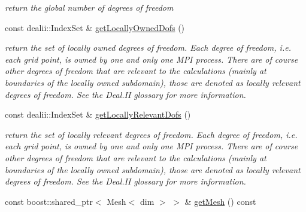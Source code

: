 \begin{DoxyCompactItemize}
\begin{DoxyCompactList}\small\item\em return the global number of degrees of freedom \item\end{DoxyCompactList}\item 
\hypertarget{classnatrium_1_1AdvectionOperator_a118d2e75644d4bab0e0349afda26688f}{
const dealii::IndexSet \& \hyperlink{classnatrium_1_1AdvectionOperator_a118d2e75644d4bab0e0349afda26688f}{getLocallyOwnedDofs} ()}
\label{classnatrium_1_1AdvectionOperator_a118d2e75644d4bab0e0349afda26688f}

\begin{DoxyCompactList}\small\item\em return the set of locally owned degrees of freedom. Each degree of freedom, i.e. each grid point, is owned by one and only one MPI process. There are of course other degrees of freedom that are relevant to the calculations (mainly at boundaries of the locally owned subdomain), those are denoted as locally relevant degrees of freedom. See the Deal.II glossary for more information. \item\end{DoxyCompactList}\item 
\hypertarget{classnatrium_1_1AdvectionOperator_a122a5378bcd93dc121cde12a95be75d8}{
const dealii::IndexSet \& \hyperlink{classnatrium_1_1AdvectionOperator_a122a5378bcd93dc121cde12a95be75d8}{getLocallyRelevantDofs} ()}
\label{classnatrium_1_1AdvectionOperator_a122a5378bcd93dc121cde12a95be75d8}

\begin{DoxyCompactList}\small\item\em return the set of locally relevant degrees of freedom. Each degree of freedom, i.e. each grid point, is owned by one and only one MPI process. There are of course other degrees of freedom that are relevant to the calculations (mainly at boundaries of the locally owned subdomain), those are denoted as locally relevant degrees of freedom. See the Deal.II glossary for more information. \item\end{DoxyCompactList}\item 
\hypertarget{classnatrium_1_1AdvectionOperator_ae5d7feac48c54abb876432e9166ea248}{
const boost::shared\_\-ptr$<$ Mesh$<$ dim $>$ $>$ \& \hyperlink{classnatrium_1_1AdvectionOperator_ae5d7feac48c54abb876432e9166ea248}{getMesh} () const }
\label{classnatrium_1_1AdvectionOperator_ae5d7feac48c54abb876432e9166ea248}


\end{DoxyCompactItemize}
